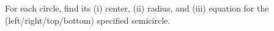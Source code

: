 \documentclass[11pt,addpoints]{exam}
\begin{document}
\begin{questions}
    \question For each circle, find its (i) center, (ii) radius, and (iii) equation for the (left/right/top/bottom) specified semicircle.
\end{questions}
\end{document}
